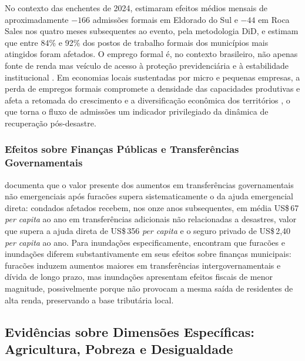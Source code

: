 \documentclass[a4paper,12pt]{article}
\begin{document}
No contexto das enchentes de 2024,  estimaram efeitos médios
mensais de aproximadamente $-166$ admissões formais em Eldorado do Sul e $-44$ em
Roca Sales nos quatro meses subsequentes ao evento, pela metodologia DiD, e
 estimam que entre 84\% e 92\% dos postos de trabalho formais dos
municípios mais atingidos foram afetados. O emprego formal é, no contexto brasileiro, não
apenas fonte de renda mas veículo de acesso à proteção previdenciária e à estabilidade
institucional \cite{krein2012, montagner2003}. Em economias locais sustentadas por
micro e pequenas empresas, a perda de empregos formais compromete a densidade das
capacidades produtivas e afeta a retomada do crescimento e a diversificação econômica
dos territórios \cite{oclery2024}, o que torna o fluxo de admissões um indicador
privilegiado da dinâmica de recuperação pós-desastre.


\subsubsection{Efeitos sobre Finanças Públicas e Transferências Governamentais}

 documenta que o valor presente dos aumentos em
transferências governamentais não emergenciais após furacões supera sistematicamente o
da ajuda emergencial direta: condados afetados recebem, nos onze anos subsequentes, em
média US\$\,67 \textit{per capita} ao ano em transferências adicionais não relacionadas a
desastres, valor que supera a ajuda direta de US\$\,356 \textit{per capita} e o seguro
privado de US\$\,2,40 \textit{per capita} ao ano. Para inundações especificamente,
 encontram que furacões e inundações diferem substantivamente em
seus efeitos sobre finanças municipais: furacões induzem aumentos maiores em
transferências intergovernamentais e dívida de longo prazo, mas inundações apresentam
efeitos fiscais de menor magnitude, possivelmente porque não provocam a mesma saída de
residentes de alta renda, preservando a base tributária local.

\subsection{Evidências sobre Dimensões Específicas: Agricultura, Pobreza e
Desigualdade}
\label{sub:agricultura}
\end{document}
